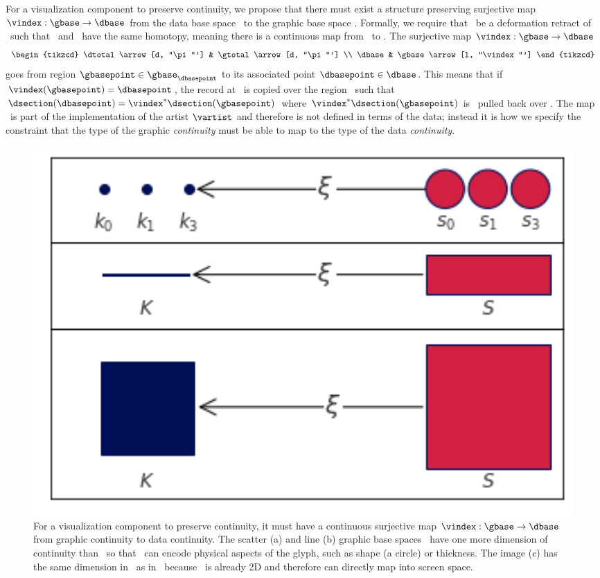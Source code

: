 \documentclass[../main.tex]{subfiles}
\begin{document}
For a visualization component to preserve continuity, we propose that there must exist a structure preserving surjective map $\vindex: \gbase\rightarrow\dbase$ from the data base space \dbase\ to the graphic base space \gbase. Formally, we require that \dbase\ be a deformation retract\cite{RetractionTopology2020} of \gbase\ such that \dbase\ and \gbase\ have the same homotopy, meaning there is a continuous map from \gbase\ to \dbase\cite{weissteinHomotopy}. The surjective map $\vindex: \gbase \rightarrow \dbase$ 
\begin{equation}
    \begin{tikzcd}
        \dtotal \arrow[d, "\pi"'] & \gtotal \arrow[d, "\pi"'] \\
        \dbase                   & \gbase \arrow[l, "\vindex"']
    \end{tikzcd}
    \label{eq:math:graphic:vindex}
\end{equation}
goes from region $\gbasepoint \in \gbase_{\dbasepoint}$ to its associated point $\dbasepoint \in \dbase$. This means that if $\vindex(\gbasepoint) = \dbasepoint$, the record at \dbasepoint\ is copied over the region \gbasepoint\ such that $\dsection(\dbasepoint)=\vindex^*\dsection(\gbasepoint)$ where $\vindex^*\dsection(\gbasepoint)$  is \dsection\ pulled back over \gbase. The map \vindex\ is part of the implementation of the artist $\mathcal{\vartist}$ and therefore is not defined in terms of the data; instead it is how we specify the constraint that the type of the graphic \textit{continuity} must be able to map to the type of the data \textit{continuity}.

\begin{figure}[H]
    \includegraphics[width=1\textwidth]{figures/math/retraction_maps.png}
    \caption{For a visualization component to preserve continuity, it must have a continuous surjective map $\vindex: \gbase\rightarrow\dbase$ from graphic continuity to data continuity. The scatter (a) and line (b) graphic base spaces \gbase\ have one more dimension of continuity than \dbase\ so that \gbase\ can encode physical aspects of the glyph, such as shape (a circle) or thickness. The image (c) has the same dimension in \gbase\ as in \dbase\ because \dbase\ is already 2D and therefore can directly map into screen space.}
    \label{fig:math:graphic:retraction:map}
\end{figure}
\end{document}
